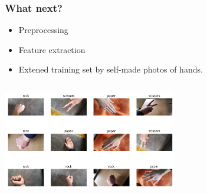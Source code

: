 \documentclass{beamer}
\begin{document}
\begin{frame}
  \frametitle{What next?}

    \begin{itemize}
        \item Preprocessing

        \item Feature extraction

        \item Extened training set by self-made photos of hands.
        
    \end{itemize}

    \centering
\includegraphics[height=2in, width=3in]{images/real.png}
  

\end{frame}
\end{document}
